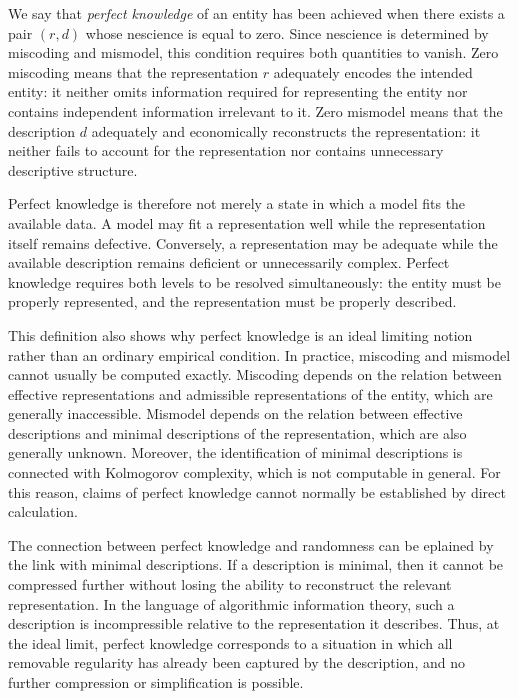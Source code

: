 We say that \emph{perfect knowledge} of an entity has been achieved when there exists a pair $(r,d)$ whose nescience is equal to zero. Since nescience is determined by miscoding and mismodel, this condition requires both quantities to vanish. Zero miscoding means that the representation $r$ adequately encodes the intended entity: it neither omits information required for representing the entity nor contains independent information irrelevant to it. Zero mismodel means that the description $d$ adequately and economically reconstructs the representation: it neither fails to account for the representation nor contains unnecessary descriptive structure.

Perfect knowledge is therefore not merely a state in which a model fits the available data. A model may fit a representation well while the representation itself remains defective. Conversely, a representation may be adequate while the available description remains deficient or unnecessarily complex. Perfect knowledge requires both levels to be resolved simultaneously: the entity must be properly represented, and the representation must be properly described.

This definition also shows why perfect knowledge is an ideal limiting notion rather than an ordinary empirical condition. In practice, miscoding and mismodel cannot usually be computed exactly. Miscoding depends on the relation between effective representations and admissible representations of the entity, which are generally inaccessible. Mismodel depends on the relation between effective descriptions and minimal descriptions of the representation, which are also generally unknown. Moreover, the identification of minimal descriptions is connected with Kolmogorov complexity, which is not computable in general. For this reason, claims of perfect knowledge cannot normally be established by direct calculation.

The connection between perfect knowledge and randomness can be eplained by the link with minimal descriptions. If a description is minimal, then it cannot be compressed further without losing the ability to reconstruct the relevant representation. In the language of algorithmic information theory, such a description is incompressible relative to the representation it describes. Thus, at the ideal limit, perfect knowledge corresponds to a situation in which all removable regularity has already been captured by the description, and no further compression or simplification is possible.

